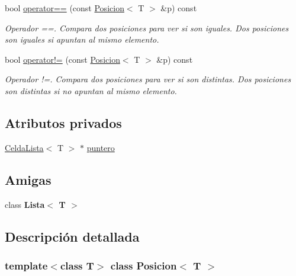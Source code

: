 \begin{DoxyCompactItemize}
bool \mbox{\hyperlink{classPosicion_a75a2ee78cb3ada83ba7165600c43583f}{operator==}} (const \mbox{\hyperlink{classPosicion}{Posicion}}$<$ T $>$ \&p) const
\begin{DoxyCompactList}\small\item\em Operador ==. Compara dos posiciones para ver si son iguales. Dos posiciones son iguales si apuntan al mismo elemento. \end{DoxyCompactList}\item 
bool \mbox{\hyperlink{classPosicion_aadc0745f3f50e9c6706e742fcf77fd2d}{operator!=}} (const \mbox{\hyperlink{classPosicion}{Posicion}}$<$ T $>$ \&p) const
\begin{DoxyCompactList}\small\item\em Operador !=. Compara dos posiciones para ver si son distintas. Dos posiciones son distintas si no apuntan al mismo elemento. \end{DoxyCompactList}\end{DoxyCompactItemize}
\subsection*{Atributos privados}
\begin{DoxyCompactItemize}
\item 
\mbox{\hyperlink{structCeldaLista}{Celda\+Lista}}$<$ T $>$ $\ast$ \mbox{\hyperlink{classPosicion_afddf381142b097c87ef24c0cb1eb458c}{puntero}}
\end{DoxyCompactItemize}
\subsection*{Amigas}
\begin{DoxyCompactItemize}
\item 
\mbox{\label{classPosicion_aaf51eba006c8c436041f4a80ac819c75}} 
class {\bfseries Lista$<$ T $>$}
\end{DoxyCompactItemize}


\subsection{Descripción detallada}
\subsubsection*{template$<$class T$>$\newline
class Posicion$<$ T $>$}

